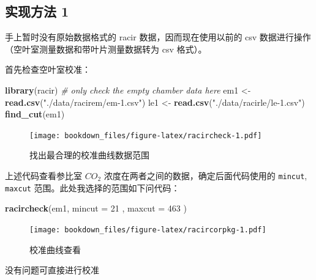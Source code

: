 \documentclass[
]{krantz}
\makeatletter
\newenvironment{Shaded}{\begin{snugshade}}{\end{snugshade}}
\newcommand{\CommentTok}[1]{\textcolor[rgb]{0.56,0.35,0.01}{\textit{#1}}}
\newcommand{\DataTypeTok}[1]{\textcolor[rgb]{0.13,0.29,0.53}{#1}}
\newcommand{\DecValTok}[1]{\textcolor[rgb]{0.00,0.00,0.81}{#1}}
\newcommand{\KeywordTok}[1]{\textcolor[rgb]{0.13,0.29,0.53}{\textbf{#1}}}
\newcommand{\NormalTok}[1]{#1}
\newcommand{\OperatorTok}[1]{\textcolor[rgb]{0.81,0.36,0.00}{\textbf{#1}}}
\newcommand{\StringTok}[1]{\textcolor[rgb]{0.31,0.60,0.02}{#1}}
\newenvironment{kframe}{%
\medskip{}
\setlength{\fboxsep}{.8em}
 \def\at@end@of@kframe{}%
 \ifinner\ifhmode%
  \def\at@end@of@kframe{\end{minipage}}%
  \begin{minipage}{\columnwidth}%
 \fi\fi%
 \def\FrameCommand##1{\hskip\@totalleftmargin \hskip-\fboxsep
 \colorbox{shadecolor}{##1}\hskip-\fboxsep
     \hskip-\linewidth \hskip-\@totalleftmargin \hskip\columnwidth}%
 \MakeFramed {\advance\hsize-\width
   \@totalleftmargin\z@ \linewidth\hsize
   \@setminipage}}%
 {\par\unskip\endMakeFramed%
 \at@end@of@kframe}
\renewenvironment{Shaded}{\begin{kframe}}{\end{kframe}}
\makeatother
\begin{document}
\hypertarget{racir_pkg_1}{%
\subsection{实现方法 1}\label{racir_pkg_1}}

手上暂时没有原始数据格式的 racir 数据，因而现在使用以前的 csv 数据进行操作（空叶室测量数据和带叶片测量数据转为 csv 格式）。

首先检查空叶室校准：

\begin{Shaded}
\begin{Highlighting}[]
\KeywordTok{library}\NormalTok{(racir)}
\CommentTok{\# only check the empty chamber data here}
\NormalTok{em1 \textless{}{-}}\StringTok{ }\KeywordTok{read.csv}\NormalTok{(}\StringTok{"./data/racirem/em{-}1.csv"}\NormalTok{)}
\NormalTok{le1 \textless{}{-}}\StringTok{ }\KeywordTok{read.csv}\NormalTok{(}\StringTok{"./data/racirle/le{-}1.csv"}\NormalTok{)}
\KeywordTok{find\_cut}\NormalTok{(em1)}
\end{Highlighting}
\end{Shaded}

\begin{figure}
\centering
\texttt{[image: bookdown\_files/figure-latex/racircheck-1.pdf]}
\caption{\label{fig:racircheck}找出最合理的校准曲线数据范围}
\end{figure}

上述代码查看参比室 \(CO_2\) 浓度在两者之间的数据，确定后面代码使用的 \texttt{mincut}, \texttt{maxcut} 范围。此处我选择的范围如下问代码：

\begin{Shaded}
\begin{Highlighting}[]
\KeywordTok{racircheck}\NormalTok{(em1, }\DataTypeTok{mincut =} \DecValTok{21}\NormalTok{ , }\DataTypeTok{maxcut =} \DecValTok{463}\NormalTok{ )}
\end{Highlighting}
\end{Shaded}

\begin{figure}
\centering
\texttt{[image: bookdown\_files/figure-latex/racircorpkg-1.pdf]}
\caption{\label{fig:racircorpkg}校准曲线查看}
\end{figure}

没有问题可直接进行校准

\begin{Shaded}
\end{Shaded}
\end{document}
